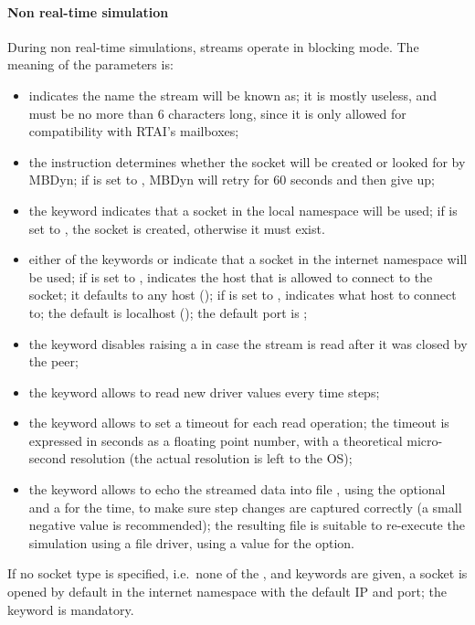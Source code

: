 \paragraph{Non real-time simulation}
During non real-time simulations, streams operate in blocking mode.
The meaning of the parameters is:
\begin{itemize}
\item {} indicates the name the stream will be known as;
it is mostly useless, and must be no more than 6 characters long,
since it is only allowed for compatibility with RTAI's mailboxes;
\item the instruction  determines whether the socket will be
created or looked for by MBDyn; if  is set to ,
MBDyn will retry for 60 seconds and then give up;
\item the keyword  indicates that a socket 
in the local namespace will be used; if  is set to ,
the socket is created, otherwise it must exist.
\item either of the keywords  or  indicate that a socket
in the internet namespace will be used;
if  is set to ,  indicates 
the host that is allowed to connect to the socket; it defaults 
to any host (); if  is set to ,
 indicates what host to connect to; the default 
is localhost (); the default port is ;
\item the keyword  disables raising a 
in case the stream is read after it was closed by the peer;
\item the keyword  allows to read new driver values
every  time steps;
\item the keyword  allows to set a timeout
for each read operation; the timeout is expressed in seconds
as a floating point number, with a theoretical micro-second resolution
(the actual resolution is left to the OS);
\item the keyword  allows to echo the streamed data
into file , using the optional 
and a  for the time, to make sure step changes are captured
correctly (a small negative value is recommended);
the resulting file is suitable to re-execute the simulation
using a  file driver, using a  value
for the  option.
\end{itemize}
If no socket type is specified, i.e.\ none of the ,  
and  keywords are given, a socket is opened by default 
in the internet namespace with the default IP and port; the 
keyword is mandatory.

